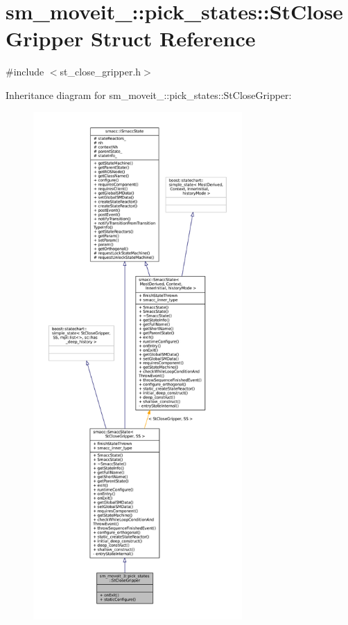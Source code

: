 \hypertarget{structsm__moveit__3_1_1pick__states_1_1StCloseGripper}{}\section{sm\+\_\+moveit\+\_\+:\+:pick\+\_\+states\+:\+:St\+Close\+Gripper Struct Reference}
\label{structsm__moveit__3_1_1pick__states_1_1StCloseGripper}


{\ttfamily \#include $<$st\+\_\+close\+\_\+gripper.\+h$>$}



Inheritance diagram for sm\+\_\+moveit\+\_\+:\+:pick\+\_\+states\+:\+:St\+Close\+Gripper\+:
\nopagebreak
\begin{figure}[H]
\begin{center}
\leavevmode
\includegraphics[height=550pt]{structsm__moveit__3_1_1pick__states_1_1StCloseGripper__inherit__graph}
\end{center}
\end{figure}


